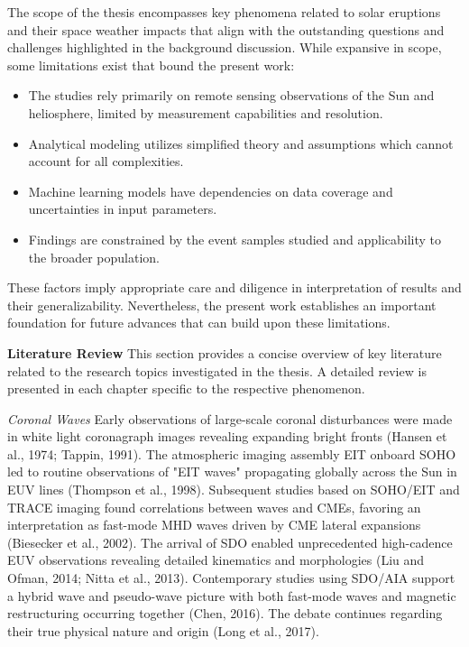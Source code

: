 The scope of the thesis encompasses key phenomena related to solar eruptions and their space weather impacts that align with the outstanding questions and challenges highlighted in the background discussion. While expansive in scope, some limitations exist that bound the present work:

\begin{itemize}
    \item The studies rely primarily on remote sensing observations of the Sun and heliosphere, limited by measurement capabilities and resolution.
    \item Analytical modeling utilizes simplified theory and assumptions which cannot account for all complexities.
    \item Machine learning models have dependencies on data coverage and uncertainties in input parameters.
    \item Findings are constrained by the event samples studied and applicability to the broader population.
\end{itemize}

These factors imply appropriate care and diligence in interpretation of results and their generalizability. Nevertheless, the present work establishes an important foundation for future advances that can build upon these limitations.

\textbf{Literature Review}
This section provides a concise overview of key literature related to the research topics investigated in the thesis. A detailed review is presented in each chapter specific to the respective phenomenon.

\textit{Coronal Waves}
Early observations of large-scale coronal disturbances were made in white light coronagraph images revealing expanding bright fronts (Hansen et al., 1974; Tappin, 1991). The atmospheric imaging assembly EIT onboard SOHO led to routine observations of "EIT waves" propagating globally across the Sun in EUV lines (Thompson et al., 1998). Subsequent studies based on SOHO/EIT and TRACE imaging found correlations between waves and CMEs, favoring an interpretation as fast-mode MHD waves driven by CME lateral expansions (Biesecker et al., 2002). The arrival of SDO enabled unprecedented high-cadence EUV observations revealing detailed kinematics and morphologies (Liu and Ofman, 2014; Nitta et al., 2013). Contemporary studies using SDO/AIA support a hybrid wave and pseudo-wave picture with both fast-mode waves and magnetic restructuring occurring together (Chen, 2016). The debate continues regarding their true physical nature and origin (Long et al., 2017).

